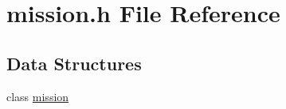 \hypertarget{a00031}{\section{mission.\-h File Reference}
\label{a00031}
}
\subsection*{Data Structures}
\begin{DoxyCompactItemize}
\item 
class \hyperlink{a00009}{mission}
\end{DoxyCompactItemize}
